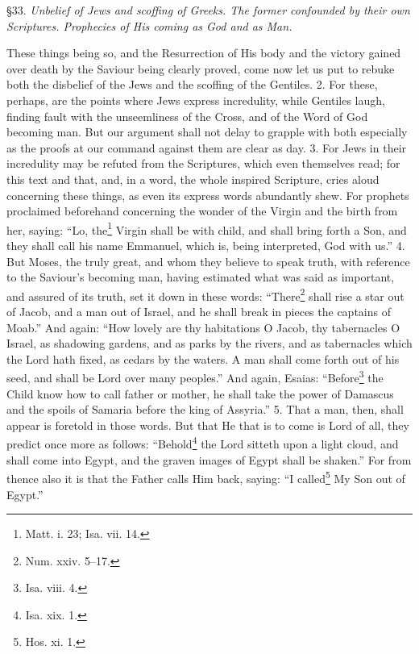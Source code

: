 
§33. \emph{Unbelief of Jews and scoffing of Greeks. The former confounded by their own Scriptures. Prophecies of His coming as God and as Man.}

These things being so, and the Resurrection of His body and the victory gained over death by the Saviour being clearly proved, come now let us put to rebuke both the disbelief of the Jews and the scoffing of the Gentiles. 2. For these, perhaps, are the points where Jews express incredulity, while Gentiles laugh, finding fault with the unseemliness of the Cross, and of the Word of God becoming man. But our argument shall not delay to grapple with both especially as the proofs at our command against them are clear as day. 3. For Jews in their incredulity may be refuted from the Scriptures, which even themselves read; for this text and that, and, in a word, the whole inspired Scripture, cries aloud concerning these things, as even its express words abundantly shew. For prophets proclaimed beforehand concerning the wonder of the Virgin and the birth from her, saying: “Lo, the\footnote{Matt. i. 23; Isa. vii. 14.} Virgin shall be with child, and shall bring forth a Son, and they shall call his name Emmanuel, which is, being interpreted, God with us.” 4. But Moses, the truly great, and whom they believe to speak truth, with reference to the Saviour’s becoming man, having estimated what was said as important, and assured of its truth, set it down in these words: “There\footnote{Num. xxiv. 5–17.} shall rise a star out of Jacob, and a man out of Israel, and he shall break in pieces the captains of Moab.” And again: “How lovely are thy habitations O Jacob, thy tabernacles O Israel, as shadowing gardens, and as parks by the rivers, and as tabernacles which the Lord hath fixed, as cedars by the waters. A man shall come forth out of his seed, and shall be Lord over many peoples.” And again, Esaias: “Before\footnote{Isa. viii. 4.} the Child know how to call father or mother, he shall take the power of Damascus and the spoils of Samaria before the king of Assyria.” 5. That a man, then, shall appear is foretold in those words. But that He that is to come is Lord of all, they predict once more as follows: “Behold\footnote{Isa. xix. 1.} the Lord sitteth upon a light cloud, and shall come into Egypt, and the graven images of Egypt shall be shaken.” For from thence also it is that the Father calls Him back, saying: “I called\footnote{Hos. xi. 1.} My Son out of Egypt.”

